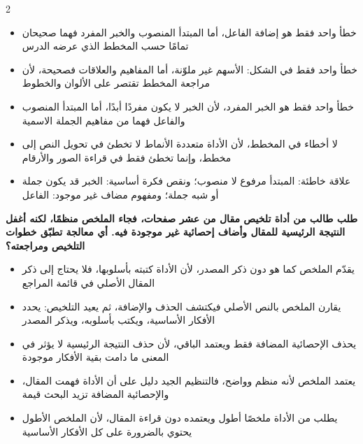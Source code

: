 \documentclass[10pt,a4paper]{article}
\begin{document}
\begin{multicols}{2}
\begin{minipage}{\linewidth}
\begin{itemize}[leftmargin=0.95cm, labelsep=4pt, itemsep=1pt, topsep=3pt, parsep=0pt]
  \item[\textbf{أ)}] خطأ واحد فقط هو إضافة الفاعل، أما المبتدأ المنصوب والخبر المفرد فهما صحيحان تمامًا حسب المخطط الذي عرضه الدرس
  \item[\textbf{ب)}] خطأ واحد فقط في الشكل: الأسهم غير ملوّنة، أما المفاهيم والعلاقات فصحيحة، لأن مراجعة المخطط تقتصر على الألوان والخطوط
  \item[\textbf{ج)}] خطأ واحد فقط هو الخبر المفرد، لأن الخبر لا يكون مفردًا أبدًا، أما المبتدأ المنصوب والفاعل فهما من مفاهيم الجملة الاسمية
  \item[\textbf{د)}] لا أخطاء في المخطط، لأن الأداة متعددة الأنماط لا تخطئ في تحويل النص إلى مخطط، وإنما تخطئ فقط في قراءة الصور والأرقام
  \item[\textbf{هـ)}] علاقة خاطئة: المبتدأ مرفوع لا منصوب؛ ونقص فكرة أساسية: الخبر قد يكون جملة أو شبه جملة؛ ومفهوم مضاف غير موجود: الفاعل
\end{itemize}
\end{minipage}\par\vspace{8pt plus 6pt}
\noindent\begin{minipage}{\linewidth}
\hangindent=0.7cm\textbf{طلب طالب من أداة تلخيص مقال من عشر صفحات، فجاء الملخص منظمًا، لكنه أغفل النتيجة الرئيسية للمقال وأضاف إحصائية غير موجودة فيه. أي معالجة تطبّق خطوات التلخيص ومراجعته؟}
\begin{itemize}[leftmargin=0.95cm, labelsep=4pt, itemsep=1pt, topsep=3pt, parsep=0pt]
  \item[\textbf{أ)}] يقدّم الملخص كما هو دون ذكر المصدر، لأن الأداة كتبته بأسلوبها، فلا يحتاج إلى ذكر المقال الأصلي في قائمة المراجع
  \item[\textbf{ب)}] يقارن الملخص بالنص الأصلي فيكتشف الحذف والإضافة، ثم يعيد التلخيص: يحدد الأفكار الأساسية، ويكتب بأسلوبه، ويذكر المصدر
  \item[\textbf{ج)}] يحذف الإحصائية المضافة فقط ويعتمد الباقي، لأن حذف النتيجة الرئيسية لا يؤثر في المعنى ما دامت بقية الأفكار موجودة
  \item[\textbf{د)}] يعتمد الملخص لأنه منظم وواضح، فالتنظيم الجيد دليل على أن الأداة فهمت المقال، والإحصائية المضافة تزيد البحث قيمة
  \item[\textbf{هـ)}] يطلب من الأداة ملخصًا أطول ويعتمده دون قراءة المقال، لأن الملخص الأطول يحتوي بالضرورة على كل الأفكار الأساسية
\end{itemize}
\end{minipage}\par\vspace{8pt plus 6pt}

\end{multicols}
\end{document}
